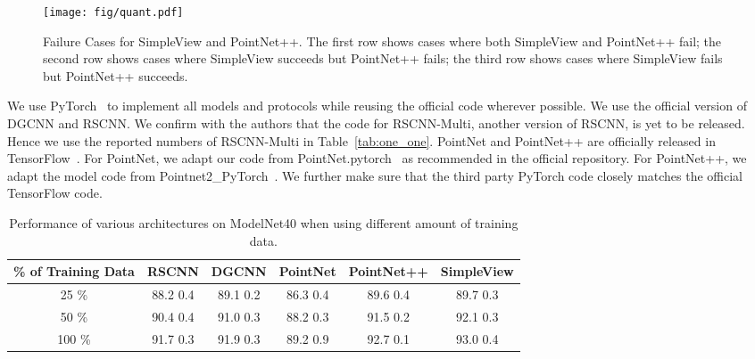 \documentclass{article}
\newcommand{\smallsec}[1]{\noindent {\bf #1:}}
\begin{document}
\begin{figure*}[htb]
\centering
\texttt{[image: fig/quant.pdf]}
\vspace{-3mm}
\caption{Failure Cases for SimpleView and PointNet++. The first row shows cases where both SimpleView and PointNet++ fail; the second row shows cases where SimpleView succeeds but PointNet++ fails; the third row shows cases where SimpleView fails but PointNet++ succeeds.}
\label{fig:quant}
\end{figure*}
\smallsec{Implementation Details} We use PyTorch~\citep{pytorch} to implement all models and protocols while reusing the official code wherever possible. We use the official version of DGCNN and RSCNN. We confirm with the authors that the code for RSCNN-Multi, another version of RSCNN, is yet to be released. Hence we use the reported numbers of RSCNN-Multi in Table~\ref{tab:one_one}. PointNet and PointNet++ are officially released in TensorFlow~\citep{tensorflow15}. For PointNet, we adapt our code from PointNet.pytorch~\citep{pointnet_pytorch} as recommended in the official repository. For PointNet++, we adapt the model code from Pointnet2\_PyTorch~\citep{pointnet2_pytorch}. We further make sure that the third party PyTorch code closely matches the official TensorFlow code.
\begin{table*}[ht]
\centering
\caption{Performance of various architectures on ModelNet40 when using different amount of training data.}
\label{tab:per_dataset}
\begin{tabular}{cccccc}
\toprule
\% of Training Data & RSCNN & DGCNN & PointNet & PointNet++ & SimpleView \\ \midrule
 25 \% & 88.2  0.4 & 89.1  0.2 & 86.3  0.4 & 89.6  0.4 & 89.7  0.3 \\
 50 \% & 90.4  0.4 & 91.0  0.3 & 88.2  0.3 & 91.5  0.2 & 92.1  0.3 \\
 100 \%& 91.7  0.3 & 91.9  0.3 & 89.2  0.9 & 92.7  0.1 & 93.0  0.4\\
\bottomrule
\end{tabular}
\vspace{-4mm}
\end{table*}
\end{document}

